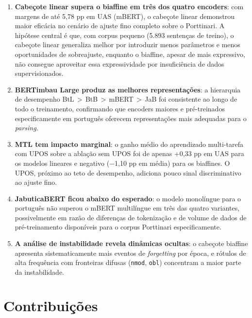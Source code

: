 \begin{enumerate}
  \item \textbf{Cabeçote linear supera o biaffine em três dos quatro encoders}: com margens
        de até 5,78 pp em UAS (mBERT), o cabeçote linear demonstrou maior eficácia no
        cenário de ajuste fino completo sobre o Porttinari. A hipótese central é que, com
        corpus pequeno (5.893 sentenças de treino), o cabeçote linear generaliza melhor por
        introduzir menos parâmetros e menos oportunidades de sobreajuste, enquanto o
        biaffine, apesar de mais expressivo, não consegue aproveitar essa expressividade
        por insuficiência de dados supervisionados.

  \item \textbf{BERTimbau Large produz as melhores representações}: a hierarquia de
        desempenho BtL\,$>$\,BtB\,$>$\,mBERT\,$>$\,JaB foi consistente ao longo de todo
        o treinamento, confirmando que encoders maiores e pré-treinados especificamente em
        português oferecem representações mais adequadas para o \textit{parsing}.

  \item \textbf{MTL tem impacto marginal}: o ganho médio do aprendizado multi-tarefa com
        UPOS sobre a ablação sem UPOS foi de apenas +0,33 pp em UAS para os modelos
        lineares e negativo ($-$1,10 pp em média) para os biaffines. O UPOS, próximo
        ao teto de desempenho, adiciona pouco sinal discriminativo ao ajuste fino.

  \item \textbf{JabuticaBERT ficou abaixo do esperado}: o modelo monolíngue para o
        português não superou o mBERT multilíngue em três das quatro variantes, possivelmente
        em razão de diferenças de tokenização e de volume de dados de pré-treinamento
        disponíveis para o corpus Porttinari especificamente.

  \item \textbf{A análise de instabilidade revela dinâmicas ocultas}: o cabeçote biaffine
        apresenta sistematicamente mais eventos de \textit{forgetting} por época, e rótulos
        de alta frequência com fronteiras difusas (\texttt{nmod}, \texttt{obl}) concentram
        a maior parte da instabilidade.
\end{enumerate}

\section{Contribuições}
\label{sec:contribuicoes}


